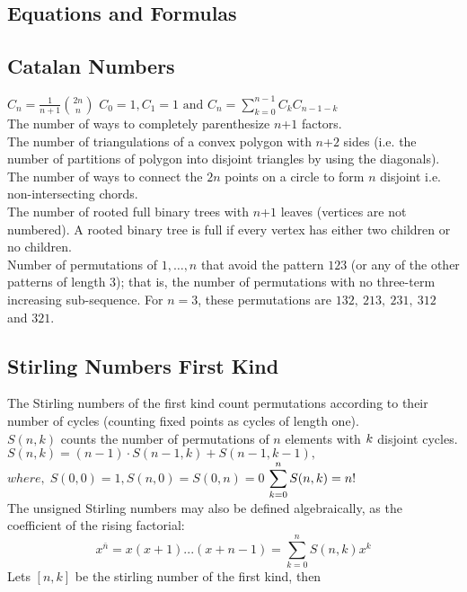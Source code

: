 \begin{multicols*}{2}
\newpage
\section{Equations and Formulas}
\subsection{Catalan Numbers}
$\displaystyle C_n=\frac{1}{n+1}{2n \choose n}$
$\displaystyle C_0=1,C_1=1\text{ and }C_n=\sum \limits_{k=0}^{n-1}C_k C_{n-1-k}$ \\
The number of ways to completely parenthesize $n$+$\displaystyle 1$ factors. \\
The number of triangulations of a convex polygon with $n$+$\displaystyle 2$ sides (i.e. the number of partitions of polygon into disjoint triangles by using the diagonals). \\
The number of ways to connect the $\displaystyle 2n$ points on a circle to form $n$ disjoint i.e. non-intersecting chords. \\
The number of rooted full binary trees with $n$+$\displaystyle 1$ leaves (vertices are not numbered). A rooted binary tree is full if every vertex has either two children or no children. \\
Number of permutations of $\displaystyle {1, …, n}$ that avoid the pattern $\displaystyle 123$ (or any of the other patterns of length $3$); that is, the number of permutations with no three-term increasing sub-sequence. For $n = 3$, these permutations are $\displaystyle 132,\ 213,\ 231,\ 312$ and $321.$

\subsection{Stirling Numbers First Kind}
The Stirling numbers of the first kind count permutations according to their number of cycles (counting fixed points as cycles of length one). \\
$S(n,k)$ counts the number of permutations of $n$ elements with $\displaystyle \displaystyle k$ disjoint cycles. \\
$S(n,k)=(n-1) \cdot S(n-1,k)+S(n-1,k-1),$ \(where,\; S(0,0)=1,S(n,0)=S(0,n)=0\)
$\displaystyle \displaystyle\sum_{k=0}^{n}S(n,k) = n!$ \\
The unsigned Stirling numbers may also be defined algebraically, as the coefficient of the rising factorial:
\[\displaystyle x^{\bar{n}} = x(x+1)...(x+n-1) = \sum_{k=0}^{n}{ S(n, k) x^k}\]
Lets $[n, k]$ be the stirling number of the first kind, then


\end{multicols*}
